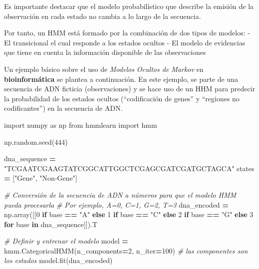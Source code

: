 \documentclass[
  a4paper,
  DIV=11,
  numbers=noendperiod]{scrreprt}
\newenvironment{Shaded}{\begin{snugshade}}{\end{snugshade}}
\newcommand{\CommentTok}[1]{\textcolor[rgb]{0.56,0.35,0.01}{\textit{#1}}}
\newcommand{\ControlFlowTok}[1]{\textcolor[rgb]{0.13,0.29,0.53}{\textbf{#1}}}
\newcommand{\DecValTok}[1]{\textcolor[rgb]{0.00,0.00,0.81}{#1}}
\newcommand{\ImportTok}[1]{#1}
\newcommand{\KeywordTok}[1]{\textcolor[rgb]{0.13,0.29,0.53}{\textbf{#1}}}
\newcommand{\NormalTok}[1]{#1}
\newcommand{\OperatorTok}[1]{\textcolor[rgb]{0.81,0.36,0.00}{\textbf{#1}}}
\newcommand{\StringTok}[1]{\textcolor[rgb]{0.31,0.60,0.02}{#1}}
\begin{document}
Es importante destacar que el modelo probabilístico que describe la
emisión de la observación en cada estado no cambia a lo largo de la
secuencia.

Por tanto, un HMM está formado por la combinación de dos tipos de
modelos: - El transicional el cual responde a los estados ocultos - El
modelo de evidencias que tiene en cuenta la información disponible de
las observaciones

Un ejemplo básico sobre el uso de \emph{Modelos Ocultos de Markov} en
\textbf{bioinformática} se plantea a continuación. En este ejemplo, se
parte de una secuencia de ADN ficticia (observaciones) y se hace uso de
un HHM para predecir la probabilidad de los estados ocultos
(``codificación de genes'' y ``regiones no codificantes'') en la
secuencia de ADN.

\begin{Shaded}
\begin{Highlighting}[numbers=left,,]
\ImportTok{import}\NormalTok{ numpy }\ImportTok{as}\NormalTok{ np}
\ImportTok{from}\NormalTok{ hmmlearn }\ImportTok{import}\NormalTok{ hmm}

\NormalTok{np.random.seed(}\DecValTok{444}\NormalTok{)}

\NormalTok{dna\_sequence }\OperatorTok{=} \StringTok{"TCGAATCGAAGTATCGGCATTGGCTCGAGCGATCGATGCTAGCA"}
\NormalTok{states }\OperatorTok{=}\NormalTok{ [}\StringTok{"Gene"}\NormalTok{, }\StringTok{"Non{-}Gene"}\NormalTok{]}

\CommentTok{\# Conversión de la secuencia de ADN a números para que el modelo HMM pueda procesarla}
\CommentTok{\# Por ejemplo, A=0, C=1, G=2, T=3}
\NormalTok{dna\_encoded }\OperatorTok{=}\NormalTok{ np.array([[}\DecValTok{0} \ControlFlowTok{if}\NormalTok{ base }\OperatorTok{==} \StringTok{"A"} \ControlFlowTok{else} \DecValTok{1} \ControlFlowTok{if}\NormalTok{ base }\OperatorTok{==} \StringTok{"C"} \ControlFlowTok{else} \DecValTok{2} \ControlFlowTok{if}\NormalTok{ base }\OperatorTok{==} \StringTok{"G"} \ControlFlowTok{else} \DecValTok{3} \ControlFlowTok{for}\NormalTok{ base }\KeywordTok{in}\NormalTok{ dna\_sequence]]).T}
\end{Highlighting}
\end{Shaded}

\begin{Shaded}
\begin{Highlighting}[numbers=left,,]
\CommentTok{\# Definir y entrenar el modelo}
\NormalTok{model }\OperatorTok{=}\NormalTok{ hmm.CategoricalHMM(n\_components}\OperatorTok{=}\DecValTok{2}\NormalTok{, n\_iter}\OperatorTok{=}\DecValTok{100}\NormalTok{) }\CommentTok{\# las componentes son los estados}
\NormalTok{model.fit(dna\_encoded) }
\end{Highlighting}
\end{Shaded}
\end{document}
